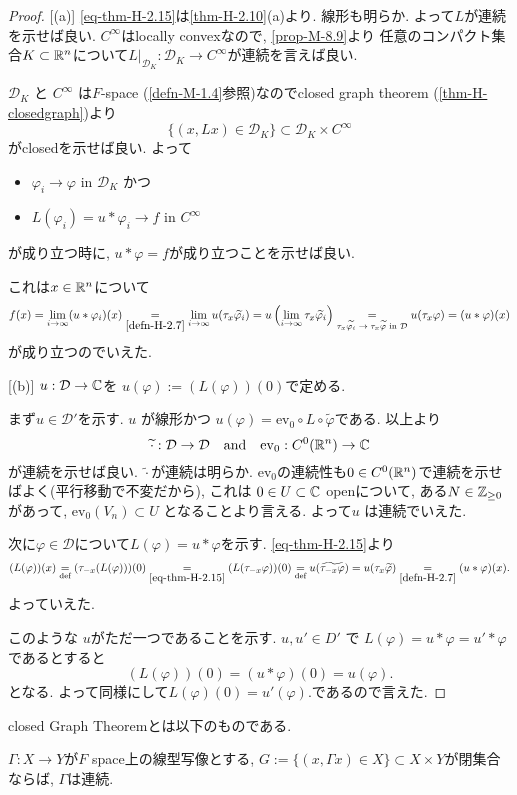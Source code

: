 \begin{proof}

[(a)]
\ref{eq-thm-H-2.15}は\ref{thm-H-2.10}(a)より. 
線形も明らか.  よって\(L\)が連続を示せば良い.
$C^\infty$はlocally convexなので, \ref{prop-M-8.9}より
任意のコンパクト集合$K \subset \mathbb{R}^n$について$L|_{\mathcal{D}_{K} } : \mathcal{D}_{K} \to C^\infty$が連続を言えば良い.

\(\mathcal{D}_{K}\) と \(C^\infty\) は\(F\)-space (\ref{defn-M-1.4}参照)なのでclosed graph theorem (\ref{thm-H-closedgraph})より
$$
\{ (x, L x) \in \mathcal{D}_{K}\} \subset \mathcal{D}_{K} \times C^\infty
$$
がclosedを示せば良い. 
よって
\begin{itemize}
\item \(\varphi_i \to \varphi\) in \(\mathcal{D}_{K}\) かつ
\item \(L(\varphi_i) = u \ast  \varphi_i \to f  \) in  \(C^\infty\)
\end{itemize}
が成り立つ時に,  \(u \ast \varphi = f\)が成り立つことを示せば良い. 

これは$x \in \mathbb{R}^n$について
\[
f(x) 
= \lim_{i \to \infty} (u \ast \varphi_i)(x)
\underset{\ref{defn-H-2.7}}{=} \lim_{i \to \infty} u(\tau_x \widetilde{\varphi_i})
= u \left( \lim_{i \to \infty} \tau_x \widetilde{\varphi_i} \right)
\underset{\text{$\tau_x \widetilde{\varphi_i} \to \tau_x \widetilde{\varphi}$ in $\mathcal{D}$}}{=} u(\tau_x \varphi) 
= (u \ast \varphi)(x) 
\]
が成り立つのでいえた.

[(b)]
 \(u :\mathcal{D} \to \mathbb{C}\)を \(u(\varphi) := (L(\varphi))(0)\)で定める. 

まず\(u \in \mathcal{D}'\)を示す. 
\(u\) が線形かつ
\(u(\varphi) = \mathrm{ev}_0 \circ L \circ \widetilde{\varphi}\)である.
以上より
\[
\widetilde{\cdot} :\mathcal{D} \to \mathcal{D}
\quad
\text{and}
\quad
\mathrm{ev}_0: C^0(\mathbb{R}^n) \to \mathbb{C}
\]
が連続を示せば良い. 
 \(\widetilde{\cdot}\)が連続は明らか.
 $\mathrm{ev}_0$の連続性も$0 \in C^0(\mathbb{R}^n)$で連続を示せばよく(平行移動で不変だから), これは
  \(0 \in U \subset \mathbb{C}\) openについて, ある\(N \in \mathbb{Z}_{\ge 0}\) があって, 
  \(\mathrm{ev}_0(V_n) \subset U\) となることより言える. 
  よって\(u\) は連続でいえた.

次に\( \varphi \in \mathcal{D}\)について\(L(\varphi) = u \ast \varphi\)を示す.
\ref{eq-thm-H-2.15}より
\[
(L(\varphi))(x) 
\underset{\text{def}}{=} (\tau_{-x}(L(\varphi)))(0)
\underset{\ref{eq-thm-H-2.15}}{=}  (L(\tau_{-x} \varphi))(0) 
\underset{\text{def}}{=}  u(\widetilde{\tau_{-x}\varphi})
= u(\tau_x \widetilde{\varphi}) 
\underset{\ref{defn-H-2.7}}{=}  (u \ast \varphi)(x).
\]
よっていえた.

このような \(u\)がただ一つであることを示す.
\(u, u' \in D'\) で \(L(\varphi) = u \ast \varphi = u' \ast\varphi\)であるとすると
\[
(L(\varphi))(0) = (u \ast \varphi)(0) = u(\varphi).
\]
となる. よって同様にして\(L(\varphi)(0) = u'(\varphi).\)であるので言えた. 
\end{proof}

closed Graph Theoremとは以下のものである.
\begin{tcolorbox}[mybox]
\begin{thm}\cite[Theorem 2.15]{Rud}
\label{thm-H-closedgraph}
$\Gamma : X \to Y$が$F$ space上の線型写像とする,
$G:= \{ (x, \Gamma x) \in X\} \subset X \times Y$が閉集合ならば, $\Gamma$は連続. 
\end{thm}
\end{tcolorbox}

